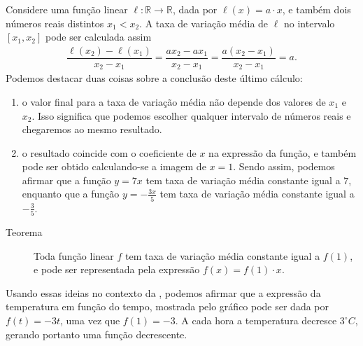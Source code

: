 Considere uma função linear \(\ell:\mathbb{R}\to\mathbb{R}\), dada por \(\ell(x)=a\cdot x\), e também dois números reais distintos \(x_1<x_2\). A taxa de variação média de \(\ell\) no intervalo  \([x_1,x_2]\) pode ser calculada assim
\begin{equation*}
\begin{split}\dfrac{\ell(x_2)-\ell(x_1)}{x_2-x_1}=\dfrac{a x_2- a x_1}{x_2-x_1}=\dfrac{a(x_2-x_1)}{x_2-x_1}=a.\end{split}
\end{equation*}
Podemos destacar duas coisas sobre a conclusão deste último cálculo:
\begin{enumerate}
\item {} 
o valor final para a taxa de variação média não depende dos valores de \(x_1\) e \(x_2\). Isso significa que podemos escolher qualquer intervalo  de números reais e chegaremos ao mesmo resultado.

\item {} 
o resultado coincide com o coeficiente de \(x\) na expressão da função, e também pode ser obtido calculando-se a imagem de \(x=1\). Sendo assim, podemos afirmar que a função \(y=7x\) tem taxa de variação média constante igual a \(7\), enquanto que a função \(y=-\frac {3x}5\) tem taxa de variação média constante igual a \(-\frac {3}5\).

\end{enumerate}

\begin{description}
\item[Teorema]
Toda função linear \(f\) tem taxa de variação média constante igual a \(f(1)\), e pode ser representada pela expressão \(f(x)=f(1)\cdot x\).
\end{description}


Usando essas ideias no contexto da , podemos afirmar que a expressão da temperatura em função do tempo, mostrada pelo gráfico pode ser dada por \(f(t)=-3t\), uma vez que \(f(1)=-3\). A cada hora a temperatura decresce \(3^\circ C\), gerando portanto uma função decrescente.

